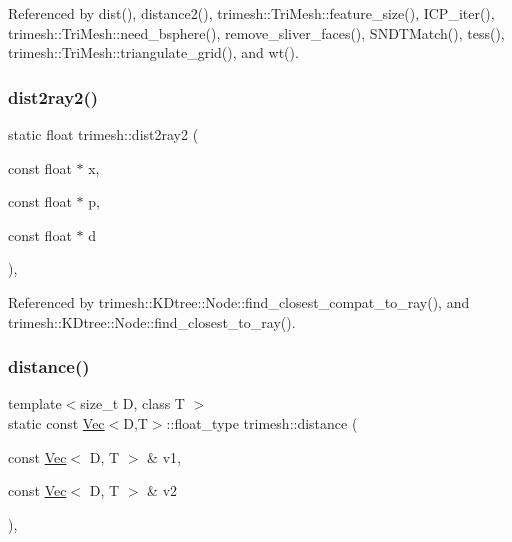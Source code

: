 Referenced by dist(), distance2(), trimesh\+::\+Tri\+Mesh\+::feature\+\_\+size(), I\+C\+P\+\_\+iter(), trimesh\+::\+Tri\+Mesh\+::need\+\_\+bsphere(), remove\+\_\+sliver\+\_\+faces(), S\+N\+D\+T\+Match(), tess(), trimesh\+::\+Tri\+Mesh\+::triangulate\+\_\+grid(), and wt().

\mbox{\label{namespacetrimesh_a543a18089e2551b0f297e83a44f24c5c}} 
\subsubsection{\texorpdfstring{dist2ray2()}{dist2ray2()}}
{\footnotesize\ttfamily static float trimesh\+::dist2ray2 (\begin{DoxyParamCaption}\item[{const float $\ast$}]{x,  }\item[{const float $\ast$}]{p,  }\item[{const float $\ast$}]{d }\end{DoxyParamCaption})\hspace{0.3cm}{\ttfamily [inline]}, {\ttfamily [static]}}



Referenced by trimesh\+::\+K\+Dtree\+::\+Node\+::find\+\_\+closest\+\_\+compat\+\_\+to\+\_\+ray(), and trimesh\+::\+K\+Dtree\+::\+Node\+::find\+\_\+closest\+\_\+to\+\_\+ray().

\mbox{\label{namespacetrimesh_a164fd9300fcf43ae1fdb0ddcc84ea67d}} 
\subsubsection{\texorpdfstring{distance()}{distance()}}
{\footnotesize\ttfamily template$<$size\+\_\+t D, class T $>$ \\
static const \hyperlink{classtrimesh_1_1Vec}{Vec}$<$D,T$>$\+::float\+\_\+type trimesh\+::distance (\begin{DoxyParamCaption}\item[{const \hyperlink{classtrimesh_1_1Vec}{Vec}$<$ D, T $>$ \&}]{v1,  }\item[{const \hyperlink{classtrimesh_1_1Vec}{Vec}$<$ D, T $>$ \&}]{v2 }\end{DoxyParamCaption})\hspace{0.3cm}{\ttfamily [inline]}, {\ttfamily [static]}}

